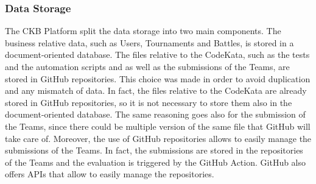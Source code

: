 \subsubsection{Data Storage}
The CKB Platform split the data storage into two main components. The business relative data, such as Users, Tournaments and Battles, is stored in a document-oriented database. The files relative to the CodeKata, such as the tests and the automation scripts and as well as the submissions of the Teams, are stored in GitHub repositories. This choice was made in order to avoid duplication and any mismatch of data. In fact, the files relative to the CodeKata are already stored in GitHub repositories, so it is not necessary to store them also in the document-oriented database. The same reasoning goes also for the submission of the Teams, since there could be multiple version of the same file that GitHub will take care of. Moreover, the use of GitHub repositories allows to easily manage the submissions of the Teams. In fact, the submissions are stored in the repositories of the Teams and the evaluation is triggered by the GitHub Action. GitHub also offers APIs that allow to easily manage the repositories.